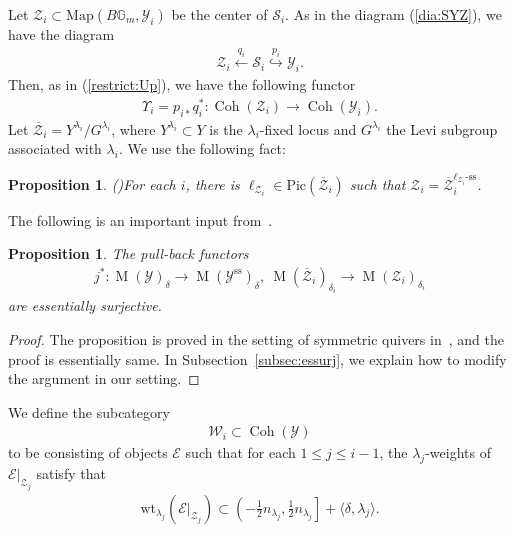 \documentclass [11pt,oneside,a4paper,mathscr]{amsart}
\newtheorem{prop}[thm]{Proposition}
\theoremstyle{definition}
\renewcommand{\leq}{\leqslant}
\newcommand{\Y}{\mathcal{Y}}
\newcommand{\zZ}{\mathcal{Z}}
\newcommand{\MM}{\operatorname{M}}
\newcommand{\bgm}{B\mathbb{G}_m}
\newcommand{\Coh}{\operatorname{Coh}}
\begin{document}
Let $\mathcal{Z}_i \subset \mathrm{Map}(\bgm, \Y_i)$ be the center of $\mathcal{S}_i$. 
As in the diagram (\ref{dia:SYZ}), we 
have the diagram 
\begin{align*}
    \mathcal{Z}_i \stackrel{q_i}{\leftarrow} \mathcal{S}_i \stackrel{p_i}{\hookrightarrow} \mathcal{Y}_i. 
\end{align*}
Then, as in (\ref{restrict:Up}), we have 
the following functor
\begin{align*}
 \Upsilon_i=p_{i\ast}q_i^{\ast} \colon \Coh(\mathcal{Z}_i) \to \Coh(\mathcal{Y}_i).
 \end{align*}
 Let $\overline{\mathcal{Z}}_i=Y^{\lambda_i}/G^{\lambda_i}$, 
 where $Y^{\lambda_i}\subset Y$ is the $\lambda_i$-fixed locus 
 and $G^{\lambda_i}$ the Levi subgroup associated with $\lambda_i$. 
We use the following fact: 
\begin{prop}\emph{(\cite[Proposition~2.18]{Hoskins})}\label{prop:Z}
For each $i$, there is $\ell_{\zZ_i}\in \mathrm{Pic}(\overline{\zZ}_i)$ such that $\zZ_i=\overline{\zZ}_i^{\ell_{\zZ_i}\text{-ss}}$.
\end{prop}
The following is an important input from~\cite[Proposition~3.22]{PThiggs}.
\begin{prop}\label{prop:ess}
The pull-back functors 
\begin{align*}
j^{\ast} \colon \MM(\mathcal{Y})_{\delta} \to \MM(\mathcal{Y}^{\mathrm{ss}})_{\delta}, \ 
  \MM(\overline{\mathcal{Z}}_i)_{\delta_i} \to \MM(\mathcal{Z}_i)_{\delta_i}
\end{align*}
are essentially surjective. 
    \end{prop}
    \begin{proof}
    The proposition is proved in the setting of symmetric quivers 
    in~\cite[Proposition~3.22]{PTquiver}, and the proof is essentially same. 
In Subsection~\ref{subsec:essurj}, we explain how to modify the argument in our setting. 
    \end{proof}
We define the subcategory 
\begin{align*}
\mathcal{W}_i \subset \Coh(\mathcal{Y})
\end{align*}
to be
consisting of objects 
$\mathcal{E}$ such that for each $1\leq j\leq i-1$, the $\lambda_j$-weights of 
$\mathcal{E}|_{\mathcal{Z}_j}$ 
satisfy that
\begin{align}\label{wt:window}
    \mathrm{wt}_{\lambda_j}(\mathcal{E}|_{\mathcal{Z}_j}) \subset 
    \left(-\frac{1}{2}n_{\lambda_j}, \frac{1}{2}n_{\lambda_j}  \right]+\langle \delta, \lambda_j\rangle.
\end{align}
\end{document}

